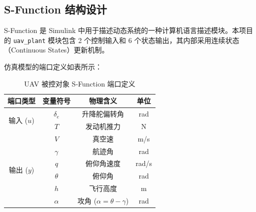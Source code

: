 \documentclass[UTF8, a4paper, 12pt]{ctexart}
\begin{document}
\subsection{S-Function 结构设计}
S-Function 是 Simulink 中用于描述动态系统的一种计算机语言描述模块。本项目的 \texttt{uav\_plant} 模块包含 2 个控制输入和 6 个状态输出，其内部采用连续状态（Continuous States）更新机制。

仿真模型的端口定义如表所示：

\begin{table}[H]
    \centering
    \caption{UAV 被控对象 S-Function 端口定义}
    \label{tab:io_port}
    \begin{tabular}{c c c c}
        \toprule
        \textbf{端口类型} & \textbf{变量符号} & \textbf{物理含义} & \textbf{单位} \\
        \midrule
        \multirow{2}{*}{输入 ($u$)} & $\delta_e$ & 升降舵偏转角 & rad \\
         & $T$ & 发动机推力 & N \\
        \midrule
        \multirow{6}{*}{输出 ($y$)} & $V$ & 真空速 & m/s \\
         & $\gamma$ & 航迹角 & rad \\
         & $q$ & 俯仰角速度 & rad/s \\
         & $\theta$ & 俯仰角 & rad \\
         & $h$ & 飞行高度 & m \\
         & $\alpha$ & 攻角 ($\alpha = \theta - \gamma$) & rad \\
        \bottomrule
    \end{tabular}
\end{table}
\end{document}
